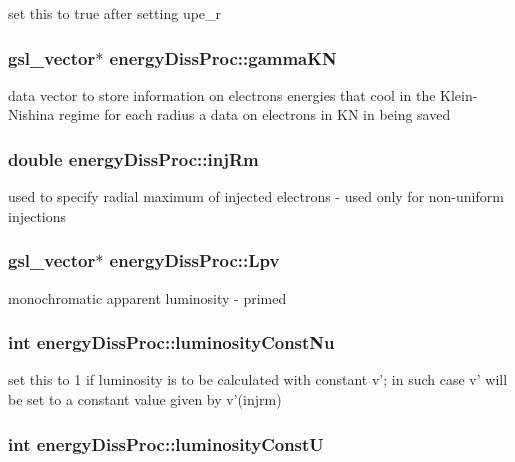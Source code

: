 set this to true after setting upe\-\_\-r \hypertarget{classenergyDissProc_a22d892e2e11fc1f161ca3d0267752f9c}{
\subsubsection[{gamma\-K\-N}]{\setlength{\rightskip}{0pt plus 5cm}gsl\-\_\-vector$\ast$ energy\-Diss\-Proc\-::gamma\-K\-N}}\label{classenergyDissProc_a22d892e2e11fc1f161ca3d0267752f9c}
data vector to store information on electrons energies that cool in the Klein-\/\-Nishina regime for each radius a data on electrons in K\-N in being saved \hypertarget{classenergyDissProc_af1c1d91f8ef5f49f2f5831776052b651}{
\subsubsection[{inj\-Rm}]{\setlength{\rightskip}{0pt plus 5cm}double energy\-Diss\-Proc\-::inj\-Rm}}\label{classenergyDissProc_af1c1d91f8ef5f49f2f5831776052b651}
used to specify radial maximum of injected electrons -\/ used only for non-\/uniform injections \hypertarget{classenergyDissProc_a235e694793915f34234654c58a0316b9}{
\subsubsection[{Lpv}]{\setlength{\rightskip}{0pt plus 5cm}gsl\-\_\-vector$\ast$ energy\-Diss\-Proc\-::\-Lpv}}\label{classenergyDissProc_a235e694793915f34234654c58a0316b9}
monochromatic apparent luminosity -\/ primed \hypertarget{classenergyDissProc_a0a23854c1c830dfb9ac33d116fce5b7d}{
\subsubsection[{luminosity\-Const\-Nu}]{\setlength{\rightskip}{0pt plus 5cm}int energy\-Diss\-Proc\-::luminosity\-Const\-Nu}}\label{classenergyDissProc_a0a23854c1c830dfb9ac33d116fce5b7d}
set this to 1 if luminosity is to be calculated with constant v'; in such case v' will be set to a constant value given by v'(injrm) \hypertarget{classenergyDissProc_a2cc4e4eae15982f977a0dfa5458d80f4}{
\subsubsection[{luminosity\-Const\-U}]{\setlength{\rightskip}{0pt plus 5cm}int energy\-Diss\-Proc\-::luminosity\-Const\-U}}\label{classenergyDissProc_a2cc4e4eae15982f977a0dfa5458d80f4}
